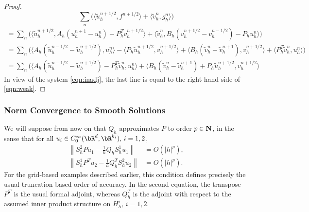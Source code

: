 \begin{proof}
\[
\sum_{n} \Big( \langle \tilde u_h^{n+1/2}, f^{n+1/2}\rangle +
					   \langle \tilde v_h^n, g_h^n \rangle \Big)
\]
\begin{equation*}
\begin{split}
	= \sum_n \Big( \langle \tilde u_h^{n+1/2}, 
					A_h( u_h^{n+1} - u_h^n) + P_h^T v_h^{n+1/2} \rangle 
			  +  \langle \tilde v_h^n, 
					B_h ( v_h^{n+1/2}-v_h^{n-1/2} ) - P_h u_h^n \rangle \Big)
\end{split}
\end{equation*}
\begin{equation*}
\begin{split}
	= \sum_n \Big( \langle A_h ( \tilde u_h^{n-1/2}-\tilde u_h^{n+1/2} ), u_h^n \rangle 
			       -\langle P_h \tilde u_h^{n+1/2}, v_h^{n+1/2}\rangle 
	 		       +\langle B_h ( \tilde v_h^{n} - \tilde v_h^{n+1} ), v_h^{n+1/2} \rangle
			       +\langle P_h^T \tilde v_h^n, u_h^n\rangle \Big)
\end{split}
\end{equation*}
\begin{equation}\label{eqn:sbp}
\begin{split}
	= \sum_n \Big( \langle A_h (\tilde u_h^{n-1/2} - \tilde u_h^{n+1/2}) - P_h^T \tilde v_h^n, 
				u_h^n\rangle 
	                      +	\langle B_h (\tilde v_h^{n} - \tilde v_h^{n+1}) + P_h \tilde u_h^{n+1/2},
	                      	v_h^{n+1/2}\rangle
\end{split}
\end{equation}
In view of the system \ref{eqn:inadj}, the last line is equal to the
right hand side of \ref{eqn:weak}.


\end{proof}

\subsubsection{Norm Convergence to Smooth Solutions}

We will suppose from now on that $Q_h$ approximates $P$ to order $p\in {\bf N}$, in the sense that
for all $u_i \in C_0^{\infty}(\bR^d,\bR^{k_i}),\, i=1,2$,
\begin{equation}
\label{eq:fdord}
\begin{split}
\left\| S^2_hPu_1 - \frac{1}{h}Q_h S^1_h u_1\right\| &= O(|h|^p),\\
\left\| S^1_hP^Tu_2 - \frac{1}{h}Q_h^T S^2_h u_2\right\| &= O(|h|^p).
\end{split}
\end{equation}
For the grid-based examples described earlier, this
condition defines precisely the usual truncation-based order of
accuracy. In the second equation, the transpose $P^T$ is the usual
formal adjoint, whereas $Q_h^T$ is the adjoint with respect to the
assumed inner product structure on $H^i_h, \,i=1,2$. 

